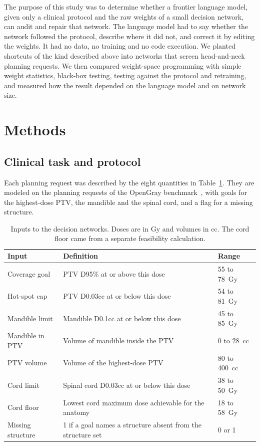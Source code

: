 \documentclass[aps,prx,reprint,superscriptaddress,nofootinbib]{revtex4-2}
\begin{document}
The purpose of this study was to determine whether a frontier language model, given only a clinical
protocol and the raw weights of a small decision network, can audit and repair that network. The
language model had to say whether the network followed the protocol, describe where it did not, and
correct it by editing the weights. It had no data, no training and no code execution. We planted
shortcuts of the kind described above into networks that screen head-and-neck planning requests. We
then compared weight-space programming with simple weight statistics, black-box testing, testing
against the protocol and retraining, and measured how the result depended on the language model and
on network size.

\section{Methods}\label{methods}

\subsection{Clinical task and protocol}\label{clinical-task-and-protocol}

Each planning request was described by the eight quantities in Table~\ref{tbl:inputs}. They are
modeled on the planning requests of the OpenGray benchmark~\cite{nusrat2026}, with goals for the
highest-dose PTV, the mandible and the spinal cord, and a flag for a missing structure.

\begin{table}[tp]
\caption{Inputs to the decision networks. Doses are in Gy and volumes in cc. The cord floor came from a
separate feasibility calculation.}\label{tbl:inputs}
\small
\begin{ruledtabular}
\begin{tabular}{lll}
Input & Definition & Range \\
\hline
Coverage goal & PTV D95\% at or above this dose & 55 to 78~Gy \\
Hot-spot cap & PTV D0.03cc at or below this dose & 54 to 81~Gy \\
Mandible limit & Mandible D0.1cc at or below this dose & 45 to 85~Gy \\
Mandible in PTV & Volume of mandible inside the PTV & 0 to 28~cc \\
PTV volume & Volume of the highest-dose PTV & 80 to 400~cc \\
Cord limit & Spinal cord D0.03cc at or below this dose & 38 to 50~Gy \\
Cord floor & Lowest cord maximum dose achievable for the anatomy & 18 to 58~Gy \\
Missing structure & 1 if a goal names a structure absent from the structure set & 0 or 1 \\
\end{tabular}
\end{ruledtabular}
\end{table}
\end{document}
